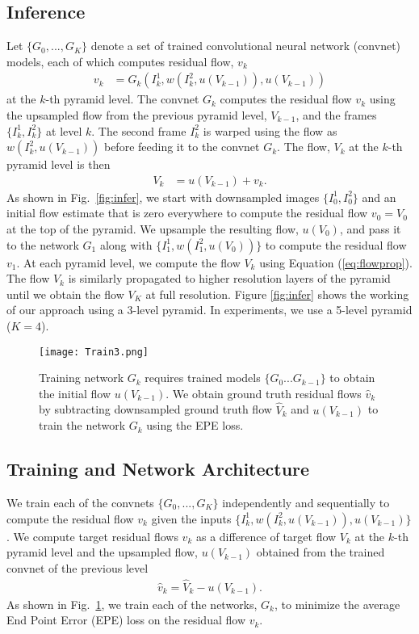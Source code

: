 \documentclass[10pt,twocolumn,letterpaper]{article}
\begin{document}
\subsection{Inference}
Let $\{G_0, ... ,G_K\}$ denote a  set of trained convolutional neural network (convnet) models,
each of which computes residual flow, $v_k$
\begin{align}
v_k &= G_k(I_k^1, w(I_k^2,u(V_{k-1}) ), u(V_{k-1}))
\end{align}
at the $k$-th pyramid level. The convnet $G_k$ computes the residual flow $v_k$ using the upsampled flow from the previous pyramid level, ${V_{k-1}}$, and the frames $\{ I^1_k, I^2_k \}$ at level $k$. 
The second frame $I^2_k$ is warped using the flow as $w(I^2_k, u({V_{k-1}}))$ before feeding it to the convnet $G_k$. The flow, $V_k$ at the $k$-th pyramid level is then 
\begin{align}
\label{eq:flowprop}
V_k &= u(V_{k-1}) + v_k .
\end{align}
As shown in Fig.~\ref{fig:infer}, we start with downsampled images $\{ I_0^1, I_0^2\}$ and an initial flow estimate that is zero everywhere to compute the residual flow $v_0 = V_0$ at the top of the pyramid. We upsample the resulting flow, $u(V_0)$, and pass it to the network $G_1$ along with $\{I_1^1, w(I_1^2, u(V_0)) \}$ to compute the residual flow $v_1$. At each pyramid level, we compute the flow $V_k$ using Equation (\ref{eq:flowprop}). The flow $V_k$ is similarly propagated to higher resolution layers of the pyramid until we obtain the flow $V_K$ at full resolution. 
Figure \ref{fig:infer} shows the working of our approach using a 3-level pyramid. In experiments, we use a 5-level pyramid ($K=4$).

\begin{figure}[t]
\centerline{   
\texttt{[image: Train3.png]}
}
   \caption{Training network $G_k$ requires trained models $\{G_0 ... G_{k-1}\}$ to obtain the initial flow $u(V_{k-1})$. We obtain ground truth residual flows $\hat{v}_k$ by subtracting downsampled ground truth flow $\hat{V}_k$ and $u(V_{k-1})$ to train the network $G_k$ using the EPE loss.}
\label{fig:Train}
\end{figure}


\subsection{Training and Network Architecture}
We train each of the convnets $\{G_0,...,G_K\}$ independently and sequentially to compute the residual flow $v_k$ given the inputs $\{I_k^1, w(I_k^2,u(V_{k-1}) ), u(V_{k-1})\}$. We compute target residual flows $\hat{v}_k$ as a difference of target flow $V_k$ at the $k$-th pyramid level and the upsampled flow, $u(V_{k-1})$ obtained from the trained convnet of the previous level
\begin{align}
\hat{v}_k = \hat{V}_k - u(V_{k-1}) .
\end{align}
As shown in Fig.~\ref{fig:Train}, we train each of the networks, $G_k$, to minimize the average End Point Error (EPE) loss on the residual flow $v_k$.
\end{document}

